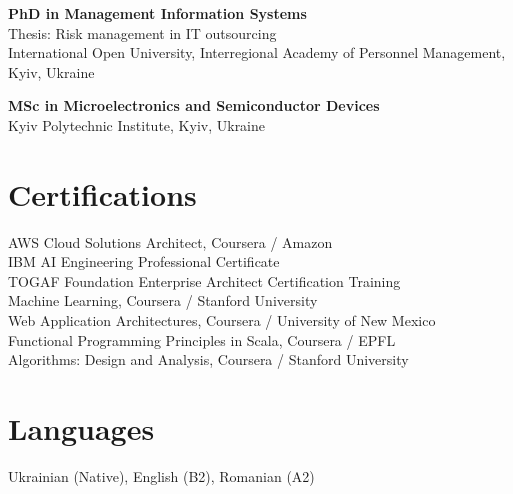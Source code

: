 \documentclass[10pt,a4paper]{article}
\begin{document}
\textbf{PhD in Management Information Systems} \\
Thesis: Risk management in IT outsourcing \\
International Open University, Interregional Academy of Personnel Management, Kyiv, Ukraine

\textbf{MSc in Microelectronics and Semiconductor Devices} \\
Kyiv Polytechnic Institute, Kyiv, Ukraine

\section*{Certifications}

AWS Cloud Solutions Architect, Coursera / Amazon \\
IBM AI Engineering Professional Certificate \\
TOGAF Foundation Enterprise Architect Certification Training \\
Machine Learning, Coursera / Stanford University \\
Web Application Architectures, Coursera / University of New Mexico \\
Functional Programming Principles in Scala, Coursera / EPFL \\
Algorithms: Design and Analysis, Coursera / Stanford University

\section*{Languages}

Ukrainian (Native), English (B2), Romanian (A2)
\end{document}
